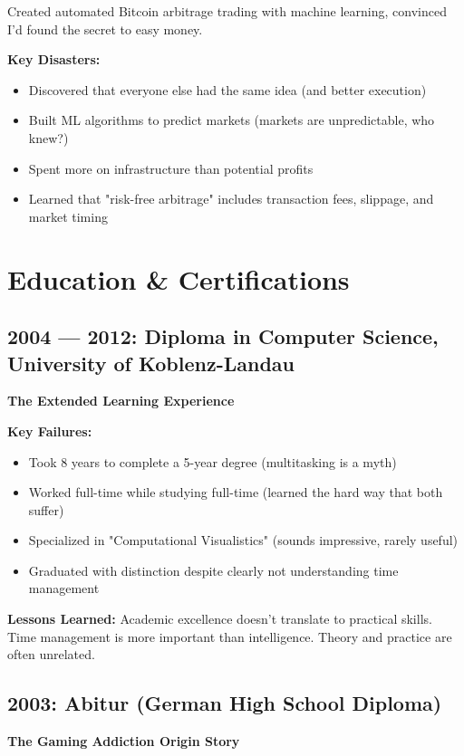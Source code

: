\documentclass[10pt,a4paper]{article}
\begin{document}
Created automated Bitcoin arbitrage trading with machine learning, convinced I'd found the secret to easy money.

\textbf{Key Disasters:}
\begin{itemize}[leftmargin=*,itemsep=1pt]
    \item Discovered that everyone else had the same idea (and better execution)
    \item Built ML algorithms to predict markets (markets are unpredictable, who knew?)
    \item Spent more on infrastructure than potential profits
    \item Learned that "risk-free arbitrage" includes transaction fees, slippage, and market timing
\end{itemize}

\section{Education \& Certifications}

\subsection{2004 — 2012: Diploma in Computer Science, University of Koblenz-Landau}
\textbf{The Extended Learning Experience}

\textbf{Key Failures:}
\begin{itemize}[leftmargin=*,itemsep=1pt]
    \item Took 8 years to complete a 5-year degree (multitasking is a myth)
    \item Worked full-time while studying full-time (learned the hard way that both suffer)
    \item Specialized in "Computational Visualistics" (sounds impressive, rarely useful)
    \item Graduated with distinction despite clearly not understanding time management
\end{itemize}

\textbf{Lessons Learned:} Academic excellence doesn't translate to practical skills. Time management is more important than intelligence. Theory and practice are often unrelated.

\subsection{2003: Abitur (German High School Diploma)}
\textbf{The Gaming Addiction Origin Story}
\end{document}
